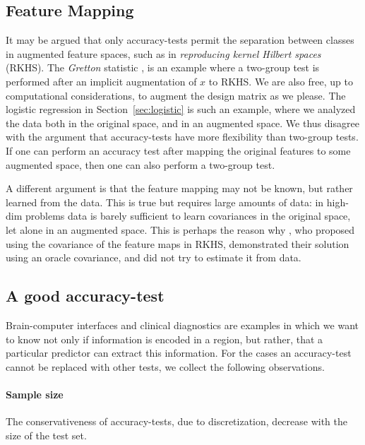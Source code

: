 \documentclass[]{bio}
\begin{document}
\subsection{Feature Mapping}
It may be argued that only accuracy-tests permit the separation between classes in augmented feature spaces, such as in \emph{reproducing kernel Hilbert spaces} (RKHS).
The \emph{Gretton} statistic \citep{gretton_kernel_2012-1}, is an example where a two-group test is performed after an implicit augmentation of $x$ to RKHS.
We are also free, up to computational considerations, to augment the design matrix as we please. 
The logistic regression in Section~\ref{sec:logistic} is such an example, where we analyzed the data both in the original space, and in an augmented space. 
We thus disagree with the argument that accuracy-tests have more flexibility than two-group tests. 
If one can perform an accuracy test after mapping the original features to some augmented space, then one can also perform a two-group test. 


A different argument is that the feature mapping may not be known, but rather learned from the data. 
This is true but requires large amounts of data: in high-dim problems data is barely sufficient to learn covariances in the original space, let alone in an augmented space.  
This is perhaps the reason why \cite{harchaoui2009kernel}, who proposed using the covariance of the feature maps in RKHS, demonstrated their solution using an oracle covariance, and did not try to estimate it from data. 





\subsection{A good accuracy-test}
Brain-computer interfaces and clinical diagnostics \citep{olivetti_induction_2012,wager_fmri-based_2013} are examples in which we want to know not only if information is encoded in a region, but rather, that a particular predictor can extract this information. 
For the cases an accuracy-test cannot be replaced with other tests, we collect the following observations.

\paragraph{Sample size} The conservativeness of accuracy-tests, due to discretization, decrease with the size of the test set. 
\end{document}
